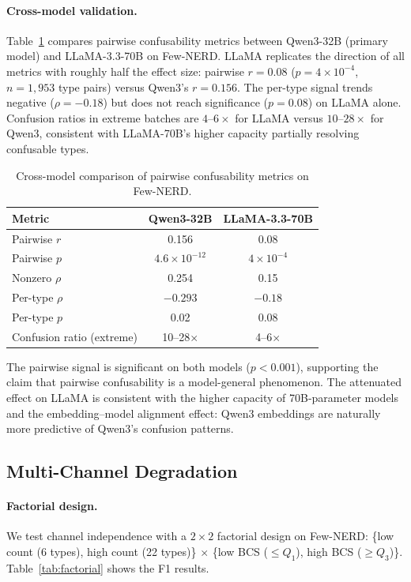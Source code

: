 \documentclass[11pt,a4paper]{article}
\begin{document}
\paragraph{Cross-model validation.}
Table~\ref{tab:cross-model} compares pairwise confusability metrics between Qwen3-32B (primary model) and LLaMA-3.3-70B on Few-NERD. LLaMA replicates the direction of all metrics with roughly half the effect size: pairwise $r=0.08$ ($p=4\times 10^{-4}$, $n=1{,}953$ type pairs) versus Qwen3's $r=0.156$. The per-type signal trends negative ($\rho=-0.18$) but does not reach significance ($p=0.08$) on LLaMA alone. Confusion ratios in extreme batches are $4$--$6\times$ for LLaMA versus $10$--$28\times$ for Qwen3, consistent with LLaMA-70B's higher capacity partially resolving confusable types.

\begin{table}[t]
\centering
\caption{Cross-model comparison of pairwise confusability metrics on Few-NERD.}
\label{tab:cross-model}
\begin{tabular}{lcc}
\toprule
\textbf{Metric} & \textbf{Qwen3-32B} & \textbf{LLaMA-3.3-70B} \\
\midrule
Pairwise $r$             & 0.156     & 0.08 \\
Pairwise $p$             & $4.6 \times 10^{-12}$ & $4 \times 10^{-4}$ \\
Nonzero $\rho$           & 0.254     & 0.15 \\
Per-type $\rho$          & $-0.293$  & $-0.18$ \\
Per-type $p$             & 0.02      & 0.08 \\
Confusion ratio (extreme) & 10--28$\times$ & 4--6$\times$ \\
\bottomrule
\end{tabular}
\end{table}

The pairwise signal is significant on both models ($p<0.001$), supporting the claim that pairwise confusability is a model-general phenomenon. The attenuated effect on LLaMA is consistent with the higher capacity of 70B-parameter models and the embedding--model alignment effect: Qwen3 embeddings are naturally more predictive of Qwen3's confusion patterns.

\subsection{Multi-Channel Degradation}
\label{sec:multichannel}

\paragraph{Factorial design.}
We test channel independence with a $2 \times 2$ factorial design on Few-NERD: \{low count (6 types), high count (22 types)\} $\times$ \{low BCS ($\leq Q_1$), high BCS ($\geq Q_3$)\}. Table~\ref{tab:factorial} shows the F1 results.
\end{document}
